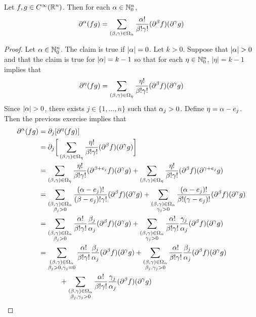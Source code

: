 \documentclass{book}
\begin{document}
	\begin{ex}
		Let $f, g \in C^{\infty}(\mathbb{R}^n)$. Then for each $\alpha \in \mathbb{N}_0^n$, 
		$$\partial^{\alpha}(fg) = \sum_{(\beta, \gamma) \in \Omega_{\alpha}} \frac{\alpha!}{\beta !\gamma!}( \partial^{\beta} f) (\partial^{\gamma}g)$$  
	\end{ex}

	\begin{proof}
		Let $\alpha \in \mathbb{N}^n_0$. The claim is true if $|\alpha| = 0$. Let $k > 0$. Suppose that $|\alpha| > 0$ and that the claim is true for $|\alpha| = k - 1$ so that for each $\eta \in \mathbb{N}^n_0$, $|\eta| = k-1$ implies that 
		$$\partial^{\eta}(fg) = \sum_{(\beta, \gamma) \in \Omega_{\eta}} \frac{\eta!}{\beta !\gamma!}( \partial^{\beta} f) (\partial^{\gamma}g)$$ 
		Since $|\alpha| > 0$, there exists $j \in \{1, \ldots, n\}$ such that $\alpha_j > 0$. Define $\eta = \alpha - e_j$. Then the previous exercise implies that 
		\begin{align*}
			\p^{\al}(fg)
			&= \p_j [\p^{\eta}(fg)] \\
			&= \p_j \bigg[ \sum_{(\be, \gam) \in \Om_{\eta}} \frac{\eta!}{\be !\gam!}( \p^{\be} f) (\p^{\gam}g) \bigg] \\
			&= \sum_{(\be, \gam) \in \Om_{\eta}} \frac{\eta!}{\be !\gam!}(\p^{\be + e_j} f) (\p^{\gam}g) + \sum_{(\be, \gam) \in \Om_{\eta}} \frac{\eta!}{\be !\gam!} (\p^{\be} f) (\p^{\gam + e_j}g) \\
			&= \sum_{\substack{(\be, \gam) \in \Om_{\al} \\ \be_j > 0}} \frac{(\al - e_j)!}{(\be - e_j) !\gam!}(\p^{\be} f) (\p^{\gam}g) + \sum_{\substack{(\be, \gam) \in \Om_{\al} \\ \gam_j > 0}} \frac{(\al - e_j)!}{\be ! (\gam - e_j)!} (\p^{\be} f) (\p^{\gam}g) \\
			& = \sum_{\substack{(\be, \gam) \in \Om_{\al} \\ \be_j > 0}} \frac{\al!}{\be !\gam !} \frac{\be_j}{\al_j}(\p^{\be} f) (\p^{\gam}g) + \sum_{\substack{(\be, \gam) \in \Om_{\al} \\ \gam_j > 0}} \frac{\al!}{\be ! \gam !}\frac{\gam_j}{\al_j} (\p^{\be} f) (\p^{\gam}g) \\
			& = \sum_{\substack{(\be, \gam) \in \Om_{\al} \\ \be_j > 0, \gam_j = 0}} \frac{\al!}{\be !\gam !} \frac{\be_j}{\al_j}(\p^{\be} f) (\p^{\gam}g) 
			+ \sum_{\substack{(\be, \gam) \in \Om_{\al} \\ \be_j, \gam_j > 0}} \frac{\al!}{\be !\gam !} \frac{\be_j}{\al_j}(\p^{\be} f) (\p^{\gam}g) \\
			& \quad \quad \quad + \sum_{\substack{(\be, \gam) \in \Om_{\al} \\ \be_j, \gam_j > 0}} \frac{\al!}{\be ! \gam !}\frac{\gam_j}{\al_j} (\p^{\be} f) (\p^{\gam}g) 

\end{align*}
\end{proof}
\end{document}
